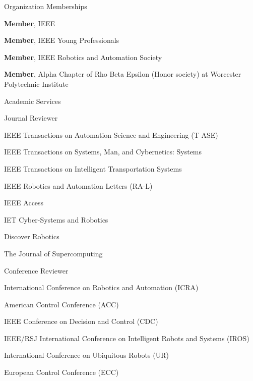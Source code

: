 \documentclass{resume} %
\begin{document}
\begin{lSection}{Organization Memberships}
\item {\bf Member}, IEEE
\item {\bf Member}, IEEE Young Professionals
\item {\bf Member}, IEEE Robotics and Automation Society
\item {\bf Member}, Alpha Chapter of Rho Beta Epsilon (Honor society) at Worcester Polytechnic Institute
\end{lSection}

\begin{rSection}{Academic Services}

\begin{lSubsection}{Journal Reviewer}
\item IEEE Transactions on Automation Science and Engineering (T-ASE)
\item IEEE Transactions on Systems, Man, and Cybernetics: Systems
\item IEEE Transactions on Intelligent Transportation Systems
\item IEEE Robotics and Automation Letters (RA-L)
\item IEEE Access
\item IET Cyber-Systems and Robotics
\item Discover Robotics
\item The Journal of Supercomputing
\end{lSubsection}

\begin{lSubsection}{Conference Reviewer}
\item International Conference on Robotics and Automation (ICRA)
\item American Control Conference (ACC)
\item IEEE Conference on Decision and Control (CDC)
\item IEEE/RSJ International Conference on Intelligent Robots and Systems (IROS)
\item International Conference on Ubiquitous Robots (UR)
\item European Control Conference (ECC)
\end{lSubsection}

\end{rSection}
\end{document}
